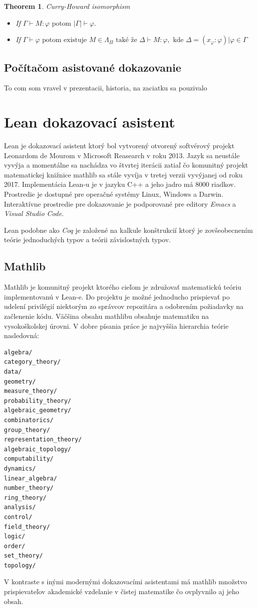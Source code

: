 \documentclass[a4paper,10pt,oneside]{report}%
\newtheorem{theorem}{Theorem}
\begin{document}
\begin{theorem}{Curry-Howard isomorphism}
    \begin{itemize}
        \item If $\Gamma \vdash M : \varphi \textrm{ potom } |\Gamma|  \vdash \varphi.$
        \item If $\Gamma \vdash \varphi \textrm{ potom existuje } M \in \Lambda_{\Pi}
            \textrm{ také že } \Delta \vdash M : \varphi, \textrm{ kde }
            \Delta = { ( x_{\varphi} : \varphi ) | \varphi \in \Gamma }$
    \end{itemize}
\end{theorem}

\section{Počítačom asistované dokazovanie}
    To com som vravel v prezentacii, historia, na zaciatku sa pouzivalo
\chapter{Lean dokazovací asistent}
    Lean je dokazovací asistent ktorý bol vytvorený otvorený softvérový projekt
Leonardom de Mourom v Microsoft Reasearch v roku 2013.
    Jazyk sa neustále vyvýja a momentálne sa nachádza vo štvrtej iterácii \cite{lean4} zatiaľ čo komunitný projekt matematickej knižnice mathlib sa stále vyvíja v tretej verzii\cite{lean3} vyvýjanej od roku 2017.
    Implementácia Lean-u je v jazyku C++ a jeho jadro má 8000 riadkov.
    Prostredie je dostupné pre operačné systémy Linux, Windows a Darwin.
    Interaktívne prostredie pre dokazovanie je podporované pre editory \emph{Emacs} a \emph{Visual Studio Code}.

    Lean podobne ako \emph{Coq} je založené na kalkule konštrukcií ktorý je zovšeobecnením teórie jednoduchých typov
    a teórii závislostných typov.
\section{Mathlib}
    Mathlib je komunitný projekt\cite{mathlib} ktorého cieľom je združovať matematickú
teóriu implementovanú v Lean-e.
    Do projektu je možné jednoducho prispievať po udelení privilégií niektorým zo
správcov repozitára a odobrením požiadavky na začlenenie kódu.
    Väčšina obsahu mathlibu obsahuje matematiku na vysokoškolskej úrovni.
    V dobre písania práce je najvyššia hierarchia teórie nasledovná:
\begin{lstlisting}
algebra/
category_theory/
data/
geometry/
measure_theory/
probability_theory/
algebraic_geometry/
combinatorics/
group_theory/
representation_theory/
algebraic_topology/
computability/
dynamics/
linear_algebra/
number_theory/
ring_theory/
analysis/
control/
field_theory/
logic/
order/
set_theory/
topology/
\end{lstlisting}
    V kontraste s inými modernými dokazovacími asistentami má mathlib množstvo
prispievateľov akademické vzdelanie v čistej matematike\cite{mathlib_paper} čo
ovplyvnilo aj jeho obsah.
\end{document}
